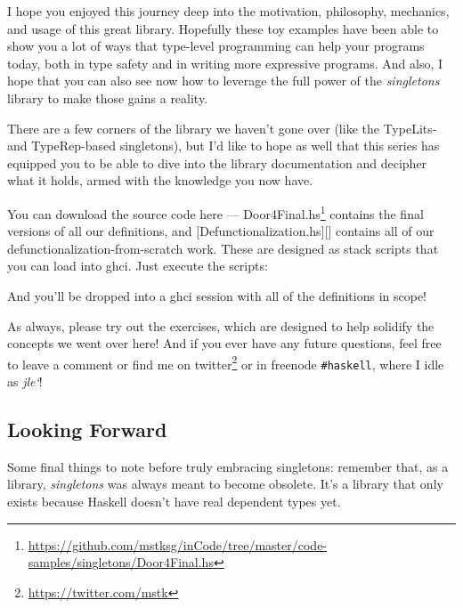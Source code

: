 \documentclass[]{article}
\newenvironment{Shaded}{}{}
\newcommand{\ExtensionTok}[1]{#1}
\newcommand{\NormalTok}[1]{#1}
\newcommand{\OperatorTok}[1]{\textcolor[rgb]{0.40,0.40,0.40}{#1}}
\renewcommand{\href}[2]{#2\footnote{\url{#1}}}
\begin{document}
I hope you enjoyed this journey deep into the motivation, philosophy, mechanics,
and usage of this great library. Hopefully these toy examples have been able to
show you a lot of ways that type-level programming can help your programs today,
both in type safety and in writing more expressive programs. And also, I hope
that you can also see now how to leverage the full power of the
\emph{singletons} library to make those gains a reality.

There are a few corners of the library we haven't gone over (like the TypeLits-
and TypeRep-based singletons), but I'd like to hope as well that this series has
equipped you to be able to dive into the library documentation and decipher what
it holds, armed with the knowledge you now have.

You can download the source code here ---
\href{https://github.com/mstksg/inCode/tree/master/code-samples/singletons/Door4Final.hs}{Door4Final.hs}
contains the final versions of all our definitions, and
{[}Defunctionalization.hs{]}{[}{]} contains all of our
defunctionalization-from-scratch work. These are designed as stack scripts that
you can load into ghci. Just execute the scripts:

\begin{Shaded}
\end{Shaded}

And you'll be dropped into a ghci session with all of the definitions in scope!

As always, please try out the exercises, which are designed to help solidify the
concepts we went over here! And if you ever have any future questions, feel free
to leave a comment or find me on \href{https://twitter.com/mstk}{twitter} or in
freenode \texttt{\#haskell}, where I idle as \emph{jle`}!

\hypertarget{looking-forward}{%
\subsection{Looking Forward}\label{looking-forward}}

Some final things to note before truly embracing singletons: remember that, as a
library, \emph{singletons} was always meant to become obsolete. It's a library
that only exists because Haskell doesn't have real dependent types yet.
\end{document}
